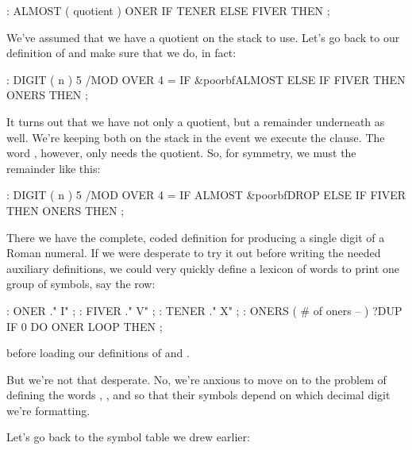\begin{Code}
: ALMOST  ( quotient )
     ONER  IF TENER ELSE FIVER THEN ;
\end{Code}
We've assumed that we have a quotient on the stack to use. Let's go back
to our definition of  and make sure that we do, in fact:

\begin{Code}[commandchars=\&\{\}]
: DIGIT  ( n )
     5 /MOD  OVER 4 =  IF  &poorbf{ALMOST}  ELSE
     IF FIVER THEN  ONERS  THEN ;
\end{Code}
It turns out that we have not only a quotient, but a remainder underneath
as well. We're keeping both on the stack in the event we execute the
 clause. The word , however, only needs the
quotient. So, for symmetry, we must  the remainder like this:

\begin{Code}[commandchars=\&\{\}]
: DIGIT  ( n )
     5 /MOD  OVER 4 =  IF  ALMOST  &poorbf{DROP}  ELSE
     IF FIVER THEN  ONERS  THEN ;
\end{Code}
There we have the complete, coded definition for producing a single digit
of a Roman numeral. If we were desperate to try it out before writing the
needed auxiliary definitions, we could very quickly define a lexicon of
words to print one group of symbols, say the  row:

\begin{Code}
: ONER    ." I" ;
: FIVER   ." V" ;
: TENER   ." X" ;
: ONERS  ( # of oners -- )
     ?DUP IF 0 DO  ONER  LOOP  THEN ;
\end{Code}
before loading our definitions of  and .

But we're not that desperate. No, we're anxious to move on to the
problem of defining the words , , and  so that their
symbols depend on which decimal digit we're formatting.

Let's go back to the symbol table we drew earlier:

\bigskip

